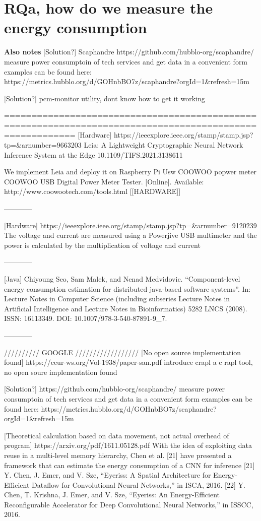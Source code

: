 \documentclass[../thesis.tex]{subfiles}
\begin{document}
\section{RQa, how do we measure the energy consumption}
\color{red}\textbf{Also notes}\color{black}
[Solution?] Scaphandre
https://github.com/hubblo-org/scaphandre/
measure power consumptoin of tech services and get data in a convenient form
examples can be found here: https://metrics.hubblo.org/d/GOHnbBO7z/scaphandre?orgId=1&refresh=15m

[Solution?] pcm-monitor utility, dont know how to get it working

=========================================================================================================
[Hardware]
https://ieeexplore.ieee.org/stamp/stamp.jsp?tp=&arnumber=9663203
Leia: A Lightweight Cryptographic Neural Network Inference System at the Edge
 10.1109/TIFS.2021.3138611

We implement Leia and deploy it on Raspberry Pi
Usw COOWOO popwer meter COOWOO USB Digital Power Meter Tester. [Online]. Available:
http://www.coowootech.com/tools.html [[HARDWARE]]

------------

[Hardware]
https://ieeexplore.ieee.org/stamp/stamp.jsp?tp=&arnumber=9120239
The voltage and current are measured using a
Powerjive USB multimeter and the power is calculated by the
multiplication of voltage and current

------------

[Java] 
Chiyoung Seo, Sam Malek, and Nenad Medvidovic. “Component-level energy
consumption estimation for distributed java-based software systems”. In: Lecture Notes in Computer Science (including subseries Lecture Notes in Artificial Intelligence and Lecture Notes in Bioinformatics) 5282 LNCS (2008). ISSN:
16113349. DOI: 10.1007/978-3-540-87891-9\_7.

------------

////////// GOOGLE //////////////////
[No open source implementation found]
https://ceur-ws.org/Vol-1938/paper-san.pdf
introduce crapl a c rapl tool, no open soure implementation found

[Solution?]
https://github.com/hubblo-org/scaphandre/
measure power consumptoin of tech services and get data in a convenient form
examples can be found here: https://metrics.hubblo.org/d/GOHnbBO7z/scaphandre?orgId=1&refresh=15m

[Theoretical calculation based on data movement, not actual overhead of program]
https://arxiv.org/pdf/1611.05128.pdf
With the idea of exploiting data reuse in a multi-level memory hierarchy, Chen et al. [21] have presented a framework that can estimate the energy consumption of a CNN for inference
[21] Y. Chen, J. Emer, and V. Sze, “Eyeriss: A Spatial Architecture for Energy-Efficient Dataflow for Convolutional Neural Networks,” in ISCA, 2016.
[22] Y. Chen, T. Krishna, J. Emer, and V. Sze, “Eyeriss: An Energy-Efficient Reconfigurable Accelerator for Deep Convolutional Neural Networks,” in ISSCC, 2016.
\end{document}
